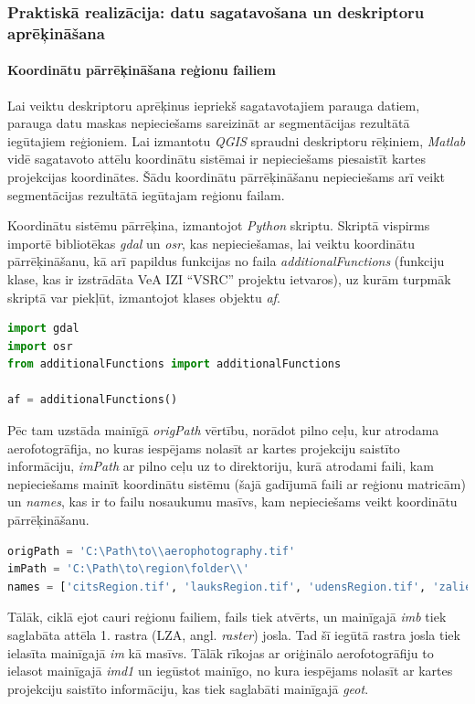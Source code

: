 \documentclass[12pt,paper=a4]{report}
\begin{document}
\subsubsection{Praktiskā realizācija: datu sagatavošana un deskriptoru aprēķināšana}
\paragraph{Koordinātu pārrēķināšana reģionu failiem}
Lai veiktu deskriptoru aprēķinus iepriekš sagatavotajiem parauga datiem, parauga datu maskas nepieciešams sareizināt ar segmentācijas rezultātā iegūtajiem reģioniem. Lai izmantotu \textit{QGIS} spraudni deskriptoru rēķiniem, \textit{Matlab} vidē sagatavoto attēlu koordinātu sistēmai ir nepieciešams piesaistīt kartes projekcijas koordinātes. Šādu koordinātu pārrēķināšanu nepieciešams arī veikt segmentācijas rezultātā iegūtajam reģionu failam.\par 
Koordinātu sistēmu pārrēķina, izmantojot \textit{Python} skriptu. Skriptā vispirms importē bibliotēkas \textit{gdal} un \textit{osr}, kas nepieciešamas, lai veiktu koordinātu pārrēķināšanu, kā arī papildus funkcijas no faila \textit{additionalFunctions} (funkciju klase, kas ir izstrādāta VeA IZI “VSRC” projektu ietvaros), uz kurām turpmāk skriptā var piekļūt, izmantojot klases objektu \textit{af}. 
\begin{lstlisting}[language=Python]
import gdal
import osr
from additionalFunctions import additionalFunctions

af = additionalFunctions()
\end{lstlisting}\par
Pēc tam uzstāda mainīgā \textit{origPath} vērtību, norādot pilno ceļu, kur atrodama aerofotogrāfija, no kuras iespējams nolasīt ar kartes projekciju saistīto informāciju, \textit{imPath} ar pilno ceļu uz to direktoriju, kurā atrodami faili, kam nepieciešams mainīt koordinātu sistēmu (šajā gadījumā faili ar reģionu matricām) un \textit{names}, kas ir to failu nosaukumu masīvs, kam nepieciešams veikt koordinātu pārrēķināšanu.
\begin{lstlisting}[language=Python]
origPath = 'C:\Path\to\\aerophotography.tif'
imPath = 'C:\Path\to\region\folder\\'
names = ['citsRegion.tif', 'lauksRegion.tif', 'udensRegion.tif', 'zaliensRegion.tif', 'kokiRegion.tif', 'region.tif']
\end{lstlisting}\par
Tālāk, ciklā ejot cauri reģionu failiem, fails tiek atvērts, un mainīgajā \textit{imb} tiek saglabāta attēla 1. rastra (LZA, angl. \textit{raster}) josla. Tad šī iegūtā rastra josla tiek ielasīta mainīgajā \textit{im} kā masīvs. Tālāk rīkojas ar oriģinālo aerofotogrāfiju to ielasot mainīgajā \textit{imd1} un iegūstot mainīgo, no kura iespējams nolasīt ar kartes projekciju saistīto informāciju, kas tiek saglabāti mainīgajā \textit{geot}.
\end{document}
